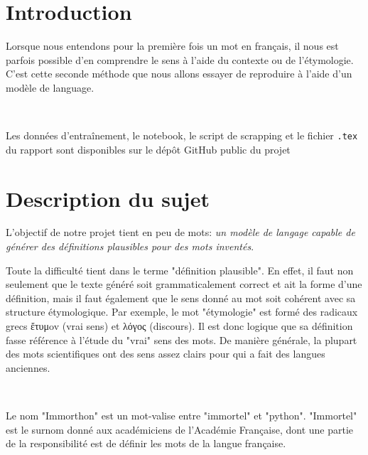 \documentclass[french]{template}
\begin{document}


\fairemarges
\fairepagedegarde
\tabledematieres

\section{Introduction}

Lorsque nous entendons pour la première fois un mot en français, il nous est parfois possible d'en comprendre le sens à l'aide du contexte ou de l'étymologie. C'est cette seconde méthode que nous allons essayer de reproduire à l'aide d'un modèle de language.

\

Les données d'entraînement, le notebook, le script de scrapping et le fichier \texttt{.tex} du rapport sont disponibles sur le dépôt GitHub public du projet

\section{Description du sujet}

L'objectif de notre projet tient en peu de mots: \textit{un modèle de langage capable de générer des définitions plausibles pour des mots inventés}.

Toute la difficulté tient dans le terme "définition plausible". En effet, il faut non seulement que le texte généré soit grammaticalement correct et ait la forme d'une définition, mais il faut également que le sens donné au mot soit cohérent avec sa structure étymologique. Par exemple, le mot "étymologie" est formé des radicaux grecs {ἔτυμov} (vrai sens) et {λόγος} (discours). Il est donc logique que sa définition fasse référence à l'étude du "vrai" sens des mots. De manière générale, la plupart des mots scientifiques ont des sens assez clairs pour qui a fait des langues anciennes.

\

Le nom "Immorthon" est un mot-valise entre "immortel" et "python". "Immortel" est le
surnom donné aux académiciens de l'Académie Française, dont une partie de la responsibilité
est de définir les mots de la langue française.
\end{document}
